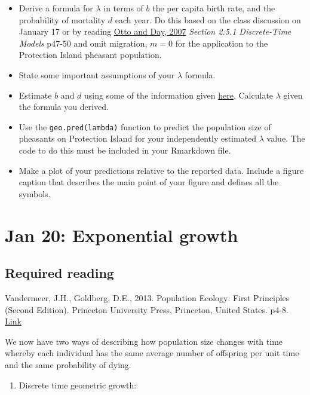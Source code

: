 \documentclass[
]{book}
\providecommand{\tightlist}{%
  \setlength{\itemsep}{0pt}\setlength{\parskip}{0pt}}
\begin{document}
\begin{itemize}
\item
  Derive a formula for \(\lambda\) in terms of \(b\) the per capita birth rate, and the probability of mortality \(d\) each year. Do this based on the class discussion on January 17 or by reading \href{https://ebookcentral.proquest.com/lib/mun/reader.action?docID=768551\&ppg=29}{Otto and Day, 2007} \emph{Section 2.5.1 Discrete-Time Models} p47-50 and omit migration, \(m=0\) for the application to the Protection Island pheasant population.
\item
  State some important assumptions of your \(\lambda\) formula.
\item
  Estimate \(b\) and \(d\) using some of the information given \protect\hyperlink{pheasant}{here}. Calculate \(\lambda\) given the formula you derived.
\item
  Use the \texttt{geo.pred(lambda)} function to predict the population size of pheasants on Protection Island for your independently estimated \(\lambda\) value. The code to do this must be included in your Rmarkdown file.
\item
  Make a plot of your predictions relative to the reported data. Include a figure caption that describes the main point of your figure and defines all the symbols.
\end{itemize}

\hypertarget{exponential}{%
\chapter{Jan 20: Exponential growth}\label{exponential}}

\hypertarget{required-reading}{%
\section{Required reading}\label{required-reading}}

Vandermeer, J.H., Goldberg, D.E., 2013. Population Ecology: First Principles (Second Edition). Princeton University Press, Princeton, United States. p4-8. \href{https://ebookcentral-proquest-com.qe2a-proxy.mun.ca/lib/mun/detail.action?docID=1205619}{Link}

We now have two ways of describing how population size changes with time whereby each individual has the same average number of offspring per unit time and the same probability of dying.

\begin{enumerate}
\def\labelenumi{\arabic{enumi})}
\tightlist
\item
  Discrete time geometric growth:
\end{enumerate}
\end{document}
